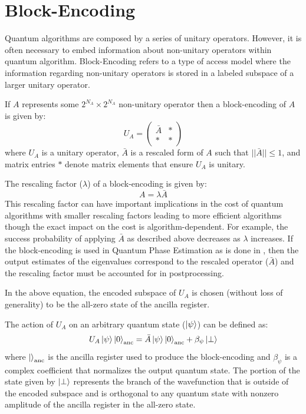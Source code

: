 \section{Block-Encoding}
\label{sec:block-encoding}

Quantum algorithms are composed by a series of unitary operators.
However, it is often necessary to embed information about non-unitary operators within quantum algorithm.
Block-Encoding refers to a type of access model where the information regarding non-unitary operators is stored in a labeled subspace of a larger unitary operator.

If $A$ represents some $2^{N_A}\times2^{N_A}$ non-unitary operator then a block-encoding of $A$ is given by:
\begin{equation}
    U_A = 
    \begin{pmatrix}
    \bar{A} & * \\
    * & * 
    \end{pmatrix}
\end{equation}
where $U_A$ is a unitary operator, $\bar{A}$ is a rescaled form of $A$ such that $||\bar{A}|| \leq 1$, and matrix entries $*$ denote matrix elements that ensure $U_A$ is unitary.

The rescaling factor ($\lambda$) of a block-encoding is given by:
\begin{equation}
    A = \lambda \bar{A}
\end{equation}
This rescaling factor can have important implications in the cost of quantum algorithms with smaller rescaling factors leading to more efficient algorithms though the exact impact on the cost is algorithm-dependent.
For example, the success probability of applying $\bar{A}$ as described above decreases as $\lambda$ increases.
If the block-encoding is used in Quantum Phase Estimation as is done in \cite{poulin2018quantum, babbush2018encoding, lee2021even}, then the output estimates of the eigenvalues correspond to the rescaled operator ($\bar{A}$) and the rescaling factor must be accounted for in postprocessing.


In the above equation, the encoded subspace of $U_A$ is chosen (without loss of generality) to be the all-zero state of the ancilla register.

The action of $U_A$ on an arbitrary quantum state ($\ket{\psi}$) can be defined as:
\begin{equation}
    \label{eq:general-block-encoding}
    U_A \ket{\psi} \ket{0}_{\text{anc}} = \bar{A} \ket{\psi} \ket{0}_{\text{anc}} + \beta_\psi \ket{\perp}
\end{equation}
where $\ket{}_{\text{anc}}$ is the ancilla register used to produce the block-encoding and $\beta_\psi$ is a complex coefficient that normalizes the output quantum state.
The portion of the state given by $\ket{\perp}$ represents the branch of the wavefunction that is outside of the encoded subspace and is orthogonal to any quantum state with nonzero amplitude of the ancilla register in the all-zero state.

